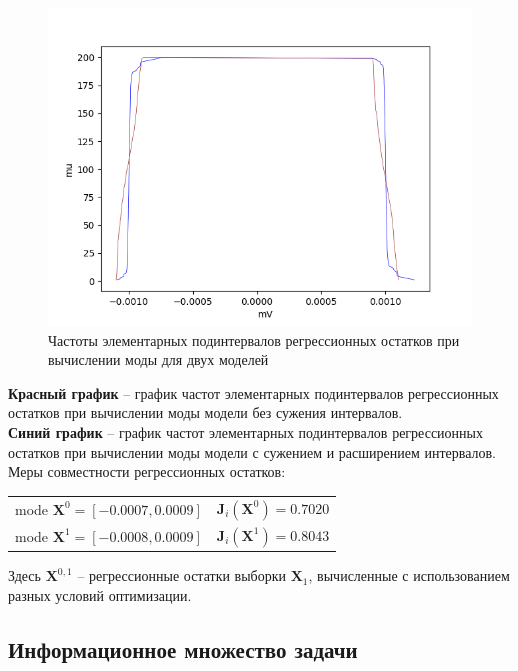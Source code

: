 \begin{figure}[H]
	\begin{center}
		\includegraphics[scale = 0.55]{mu.png}
	\end{center}
	\caption{Частоты элементарных подинтервалов регрессионных остатков при вычислении моды для двух моделей}
\end{figure}

\textbf{Красный график} -- график частот элементарных подинтервалов регрессионных остатков при вычислении моды модели без сужения интервалов. \\
\textbf{Синий график} -- график частот элементарных подинтервалов регрессионных остатков при вычислении моды модели с сужением и расширением интервалов. \\

Меры совместности регрессионных остатков: \\

\begin{tabular}{c c}
	mode $\bm{X}^0 = [-0.0007, 0.0009]$ & $\bm{J}_i(\bm{X}^0) = 0.7020$ \\
	mode $\bm{X}^1 = [-0.0008, 0.0009]$ & $\bm{J}_i(\bm{X}^1) = 0.8043$ \\
\end{tabular}

Здесь $\bm{X}^{0,1}$ -- регрессионные остатки выборки $\bm{X}_1$, вычисленные с использованием разных условий оптимизации. \\

\subsection{Информационное множество задачи} 

